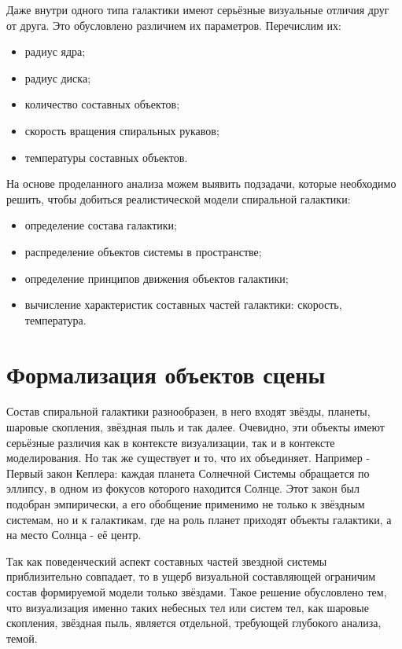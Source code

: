 Даже внутри одного типа галактики имеют серьёзные визуальные отличия друг от друга. Это обусловлено различием их параметров. Перечислим их:
\begin{itemize}
    \item радиус ядра;
    \item радиус диска;
    \item количество составных объектов;
    \item скорость вращения спиральных рукавов;
    \item температуры составных объектов.
\end{itemize}

На основе проделанного анализа можем выявить подзадачи, которые необходимо решить, чтобы добиться реалистической модели спиральной галактики:
\begin{itemize}
    \item определение состава галактики;
    \item распределение объектов системы в пространстве;
    \item определение принципов движения объектов галактики;
    \item вычисление характеристик составных частей галактики: скорость, температура.
\end{itemize}

\section{Формализация объектов сцены}

Состав спиральной галактики разнообразен, в него входят звёзды, планеты, шаровые скопления, звёздная пыль и так далее. Очевидно, эти объекты имеют серьёзные различия как в контексте визуализации, так и в контексте моделирования. Но так же существует и то, что их объединяет. Например - Первый закон Кеплера: каждая планета Солнечной Системы обращается по эллипсу, в одном из фокусов которого находится Солнце. Этот закон был подобран эмпирически, а его обобщение применимо не только к звёздным системам, но и к галактикам, где на роль планет приходят объекты галактики, а на место Солнца - её центр.

Так как поведенческий аспект составных частей звездной системы приблизительно совпадает, то в ущерб визуальной составляющей ограничим состав формируемой модели только звёздами. Такое решение обусловлено тем, что визуализация именно таких небесных тел или систем тел, как шаровые скопления, звёздная пыль, является отдельной, требующей глубокого анализа, темой.

